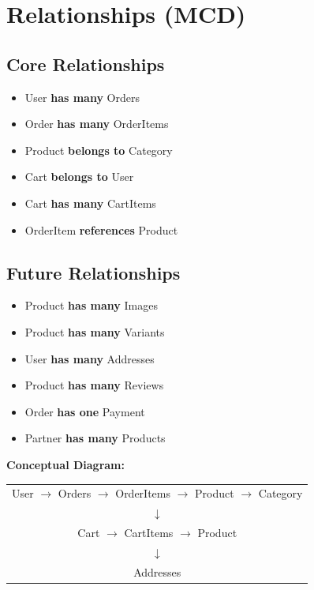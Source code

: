 \documentclass[12pt,a4paper]{article}
\begin{document}
\section{Relationships (MCD)}

\subsection{Core Relationships}
\begin{itemize}[noitemsep]
    \item User \textbf{has many} Orders
    \item Order \textbf{has many} OrderItems
    \item Product \textbf{belongs to} Category
    \item Cart \textbf{belongs to} User
    \item Cart \textbf{has many} CartItems
    \item OrderItem \textbf{references} Product
\end{itemize}

\subsection{Future Relationships}
\begin{itemize}[noitemsep]
    \item Product \textbf{has many} Images
    \item Product \textbf{has many} Variants
    \item User \textbf{has many} Addresses
    \item Product \textbf{has many} Reviews
    \item Order \textbf{has one} Payment
    \item Partner \textbf{has many} Products
\end{itemize}

\textbf{Conceptual Diagram:}
\begin{center}
\begin{tabular}{c}
User \; $\rightarrow$ Orders $\rightarrow$ OrderItems $\rightarrow$ Product $\rightarrow$ Category \\
\quad $\downarrow$ \\
Cart $\rightarrow$ CartItems $\rightarrow$ Product \\
\quad $\downarrow$ \\
Addresses
\end{tabular}
\end{center}
\end{document}
